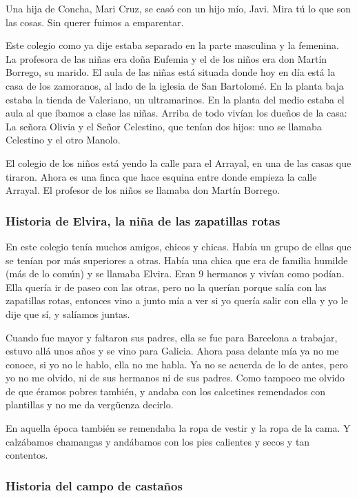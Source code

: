 \documentclass[12pt,a5paper]{book}
\begin{document}
Una hija de Concha, Mari Cruz, se casó con un hijo mío, Javi. Mira tú lo que son las cosas. Sin querer fuimos a emparentar.

Este colegio como ya dije estaba separado en la parte masculina y la femenina. La profesora de las niñas era doña Eufemia y el de los niños era don Martín Borrego, su marido. El aula de las niñas está situada donde hoy en día está la casa de los zamoranos, al lado de la iglesia de San Bartolomé. En la planta baja estaba la tienda de Valeriano, un ultramarinos. En la planta del medio estaba el aula al que íbamos a clase las niñas. Arriba de todo vivían los dueños de la casa: La señora Olivia y el Señor Celestino, que tenían dos hijos: uno se llamaba Celestino y el otro Manolo.

El colegio de los niños está yendo la calle para el Arrayal, en una de las casas que tiraron. Ahora es una finca que hace esquina entre donde empieza la calle Arrayal. El profesor de los niños se llamaba don Martín Borrego.


\subsubsection*{Historia de Elvira, la niña de las zapatillas rotas}

En este colegio tenía muchos amigos, chicos y chicas. Había un grupo de ellas que se tenían por más superiores a otras. Había una chica que era de familia humilde (más de lo común) y se llamaba Elvira. Eran 9 hermanos y vivían como podían. Ella quería ir de paseo con las otras, pero no la querían porque salía con las zapatillas rotas, entonces vino a junto mía a ver si yo quería salir con ella y yo le dije que sí, y salíamos juntas.

Cuando fue mayor y faltaron sus padres, ella se fue para Barcelona a trabajar, estuvo allá unos años y se vino para Galicia. Ahora pasa delante mía ya no me conoce, si yo no le hablo, ella no me habla. Ya no se acuerda de lo de antes, pero yo no me olvido, ni de sus hermanos ni de sus padres. Como tampoco me olvido de que éramos pobres también, y andaba con los calcetines remendados con plantillas y no me da vergüenza decirlo.

En aquella época también se remendaba la ropa de vestir y la ropa de la cama. Y calzábamos chamangas y andábamos con los pies calientes y secos y tan contentos.


\subsubsection*{Historia del campo de castaños}
\end{document}
